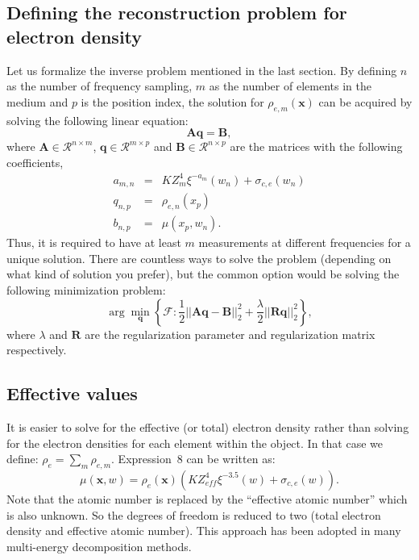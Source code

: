 \documentclass[12pt]{article}
\begin{document}
\subsection{Defining the reconstruction problem for electron density}
Let us formalize the inverse problem mentioned in the last section. By defining $n$ as the number of frequency sampling, $m$ as the number of elements in the medium and $p$ is the position index, the solution for $\rho_{e,m}(\textbf{x})$ can be acquired by solving the following linear equation:
\begin{equation}
  \textbf{A}\textbf{q} = \textbf{B}, \label{axb}
\end{equation}
where $\textbf{A}\in\mathcal{R}^{n\times m}$, $\textbf{q}\in\mathcal{R}^{m\times p}$ and $\textbf{B}\in\mathcal{R}^{n\times p}$ are the matrices with the following coefficients,
\begin{eqnarray}
 a_{m,n} &=&  KZ^4_m\xi^{-a_m}(w_n) + \sigma_{c,e}(w_n) \\
 q_{n,p} &=& \rho_{e,n}(x_p) \\
 b_{n,p} &=& \mu(x_p,w_n).
\end{eqnarray}
Thus, it is required to have at least $m$ measurements at different frequencies for a unique solution. There are countless ways to solve the problem (depending on what kind of solution you prefer), but the common option would be solving the following minimization problem:
\begin{equation}
  \arg\min_\textbf{q}\left\lbrace \mathcal{F}:\frac{1}{2}\left|\left|\textbf{A}\textbf{q} - \textbf{B}\right|\right|^2_2+\frac{\lambda}{2}\left|\left|\textbf{R}\textbf{q}\right|\right|^2_2\right\rbrace,
\end{equation}
where $\lambda$ and $\textbf{R}$ are the regularization parameter and regularization matrix respectively. 

\subsection{Effective values}
It is easier to solve for the effective (or total) electron density rather than solving for the electron densities for each element within the object. In that case we define: $\rho_e=\sum_m\rho_{e,m}$. Expression~8 can be written as:
\begin{equation}
 \mu(\textbf{x},w) = \rho_e(\textbf{x})\left(KZ^4_{eff}\xi^{-3.5}(w) + \sigma_{c,e}(w)\right).
\end{equation}
Note that the atomic number is replaced by the ``effective atomic number'' which is also unknown. So the degrees of freedom is reduced to two (total electron density and effective atomic number). This approach has been adopted in many multi-energy decomposition methods.
\end{document}
